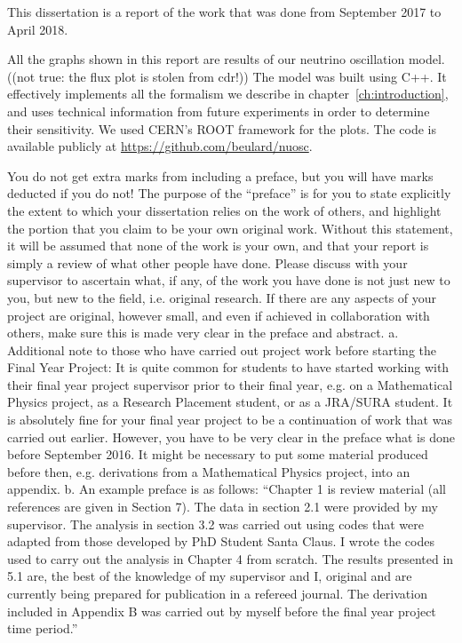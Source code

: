%
%        
%        

This dissertation is a report of the work that was done from September 2017 to
April 2018.

All the graphs shown in this report are results of our neutrino oscillation
model. ((not true: the flux plot is stolen from cdr!))
The model was built using C++. It effectively implements all
the formalism we describe in chapter~\ref{ch:introduction}, and uses technical
information from future experiments in order to determine their sensitivity. 
We used CERN's ROOT framework\cite{ROOT} for the plots. The code is available
publicly at \href{url}{https://github.com/beulard/nuosc}.


You do not get extra marks from including a preface, but you will have marks
deducted if you do not! The purpose of the “preface” is for you to state
explicitly the extent to which your dissertation relies on the work of others,
and highlight the portion that you claim to be your own original work.  Without
this statement, it will be assumed that none of the work is your own, and that
your report is simply a review of what other people have done. Please discuss
with your supervisor to ascertain what, if any, of the work you have done is
not just new to you, but new to the field, i.e. original research. If there are
any aspects of your project are original, however small, and even if achieved
in collaboration with others, make sure this is made very clear in the preface
and abstract. 
a.	Additional note to those who have carried out project work before starting the Final Year Project: It is quite common for students to have started working with their final year project supervisor prior to their final year, e.g. on a Mathematical Physics project, as a Research Placement student, or as a JRA/SURA student. It is absolutely fine for your final year project to be a continuation of work that was carried out earlier. However, you have to be very clear in the preface what is done before September 2016. It might be necessary to put some material produced before then, e.g. derivations from a Mathematical Physics project, into an appendix.
b.	An example preface is as follows: “Chapter 1 is review material (all references are given in Section 7). The data in section 2.1 were provided by my supervisor.  The analysis in section 3.2 was carried out using codes that were adapted from those developed by PhD Student Santa Claus. I wrote the codes used to carry out the analysis in Chapter 4 from scratch. The results presented in 5.1 are, the best of the knowledge of my supervisor and I, original and are currently being prepared for publication in a refereed journal. The derivation included in Appendix B was carried out by myself before the final year project time period.” 
